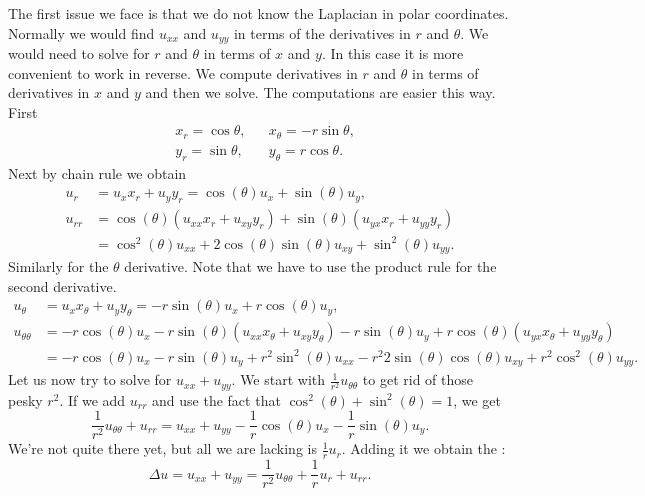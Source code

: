 \documentclass{ximera}
\begin{document}
The first issue we face is that we do not know the Laplacian in polar coordinates. Normally we would find $u_{xx}$ and $u_{yy}$ in terms of the derivatives in $r$ and $\theta$.  We would need to solve for $r$ and $\theta$ in terms of $x$ and $y$.  In this case it is more convenient to work in reverse.  We compute derivatives in $r$ and $\theta$ in terms of derivatives in $x$ and $y$ and then we solve.  The computations are easier this way.  First
\begin{equation*}
    \begin{aligned}
        & x_r = \cos \theta, & & x_\theta = - r \sin \theta, \\
        & y_r = \sin \theta, & & y_\theta = r \cos \theta.
    \end{aligned}
\end{equation*}
Next by chain rule we obtain
\begin{align*}
    u_r & = u_x x_r + u_y y_r = \cos(\theta) u_x + \sin(\theta) u_y , \\
    u_{rr} & = \cos(\theta) ( u_{xx} x_r +u_{xy} y_r ) + \sin(\theta) ( u_{yx} x_r +u_{yy} y_r ) \\
    & = \cos^2(\theta) u_{xx} + 2 \cos(\theta)\sin(\theta) u_{xy} + \sin^2(\theta) u_{yy} .
\end{align*}
Similarly for the $\theta$ derivative.  Note that we have to use the product rule for the second derivative.
\begin{align*}
    u_\theta & = u_x x_\theta + u_y y_\theta = -r\sin(\theta) u_x + r\cos(\theta) u_y , \\
    u_{\theta\theta} & = -r\cos(\theta) u_x - r\sin(\theta) (u_{xx} x_\theta + u_{xy} y_\theta) - r\sin(\theta) u_y + r\cos(\theta) (u_{yx} x_\theta + u_{yy} y_\theta)\\
    & = -r\cos(\theta) u_x -r\sin(\theta) u_y +r^2 \sin^2(\theta) u_{xx} -r^2 2\sin(\theta)\cos(\theta) u_{xy} +r^2 \cos^2(\theta) u_{yy} .
\end{align*}
Let us now try to solve for $u_{xx} + u_{yy}$.  We start with $\frac{1}{r^2} u_{\theta\theta}$ to get rid of those pesky $r^2$. If we add $u_{rr}$ and use the fact that $\cos^2(\theta) +\sin^2(\theta) = 1$, we get
\begin{equation*}
    \frac{1}{r^2} u_{\theta\theta} + u_{rr} = u_{xx} + u_{yy} - \frac{1}{r} \cos(\theta) u_x - \frac{1}{r} \sin(\theta) u_y .
\end{equation*}
We're not quite there yet, but all we are lacking is $\frac{1}{r} u_r$.  Adding it we obtain the \emph{}:
\begin{equation*}
    \Delta u = u_{xx} + u_{yy} = \frac{1}{r^2} u_{\theta\theta} + \frac{1}{r} u_{r} + u_{rr} .
\end{equation*}
\end{document}
